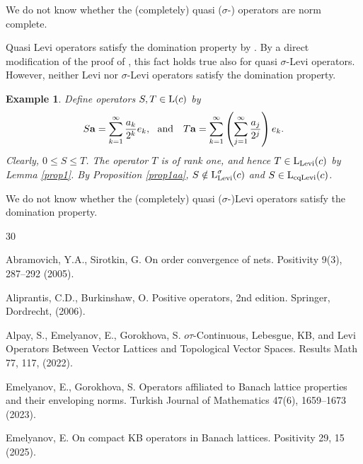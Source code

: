 \documentclass[10pt]{article}
\makeatletter
\newtheorem{example}[theorem]{Example}
\renewcommand{\subsection}{\@startsection{subsection}{1}
{0pt}{3.25ex plus 1ex minus.2ex}{-1em}{\normalfont\normalsize\bf}}
\makeatother
\begin{document}
{{{\noindent
We do not know whether the (completely) quasi ($\sigma$-){} operators are norm complete.

\medskip
Quasi Levi operators satisfy the domination property by \cite[Theorem 2.7]{AlEG2022}.
By a direct modification of the proof of \cite[Theorem 2.7]{AlEG2022},
this fact holds true also for quasi $\sigma$-Levi operators.
However, neither Levi nor $\sigma$-Levi operators satisfy the domination property.

\begin{example}\label{domination for Levi fails}%
{\em
Define operators $S,T\in\text{\rm L}(c)$ by
$$
   S\mathbf{a}=\sum_{k=1}^\infty \frac{a_k}{2^k} e_k, \ \ \text{\rm and}\ \ \ 
   T\mathbf{a}=
   \sum_{k=1}^\infty\left(\sum_{j=1}^\infty\frac{a_j}{2^j}\right) e_k.
$$
Clearly, $0\le S\le T$. The operator $T$ is of rank one, and hence  
$T\in\text{\rm L}_{\text{\rm Levi}}(c)$ by Lemma \ref{prop1}. 
By Proposition \ref{prop1aa},
$S\notin\text{\rm L}^\sigma_{\text{\rm Levi}}(c)$ and
$S\in\text{\rm L}_{\text{\rm cqLevi}}(c)$.
}
\end{example}

\noindent
We do not know whether the (completely) quasi ($\sigma$-)Levi operators satisfy the domination property.


\bigskip


{\normalsize 
\begin{thebibliography}{30}

Abramovich, Y.A., Sirotkin, G.
On order convergence of nets. 
Positivity 9(3), 287--292 (2005).

Aliprantis, C.D., Burkinshaw, O.
Positive operators, 2nd edition.
Springer, Dordrecht, (2006).

Alpay, S., Emelyanov, E., Gorokhova, S.
$o\tau$-Continuous, Lebesgue, KB, and Levi Operators Between 
Vector Lattices and Topological Vector Spaces. 
Results Math 77, 117, (2022).

Emelyanov, E., Gorokhova, S.
Operators affiliated to Banach lattice properties and their enveloping norms. 
Turkish Journal of Mathematics 47(6), 1659--1673 (2023).

Emelyanov, E. 
On compact KB operators in Banach lattices. 
Positivity 29, 15 (2025).


\end{thebibliography}}}}}
\end{document}
